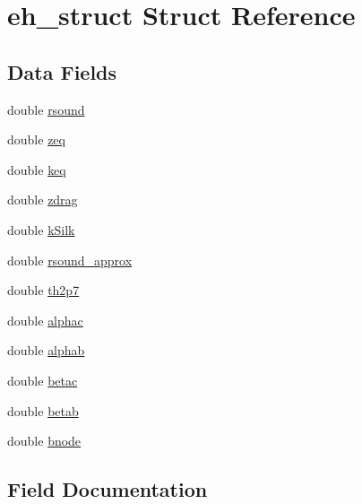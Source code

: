 \hypertarget{structeh__struct}{}\section{eh\+\_\+struct Struct Reference}
\label{structeh__struct}
\subsection*{Data Fields}
\begin{DoxyCompactItemize}
\item 
double \mbox{\hyperlink{structeh__struct_a3e1e2d1a06f3dfac72335503ccb2b219}{rsound}}
\item 
double \mbox{\hyperlink{structeh__struct_a115be04402be00203663cbf0cdeb6ccc}{zeq}}
\item 
double \mbox{\hyperlink{structeh__struct_a9eafa98df2832dd506fee87ec8a66b6c}{keq}}
\item 
double \mbox{\hyperlink{structeh__struct_af3d1d22e42cdf316b3572a9149d98596}{zdrag}}
\item 
double \mbox{\hyperlink{structeh__struct_a5765425c588003819015e840c4393da8}{k\+Silk}}
\item 
double \mbox{\hyperlink{structeh__struct_ab3e90131494df499d4be228108c04fb7}{rsound\+\_\+approx}}
\item 
double \mbox{\hyperlink{structeh__struct_afd9583995f4670685035d05749c385f0}{th2p7}}
\item 
double \mbox{\hyperlink{structeh__struct_a58de15592e924e87fe1b838599579a70}{alphac}}
\item 
double \mbox{\hyperlink{structeh__struct_a623316721501ca221093de25e216ac9f}{alphab}}
\item 
double \mbox{\hyperlink{structeh__struct_a9858b8089eb528b279fd4ce1dd1796b7}{betac}}
\item 
double \mbox{\hyperlink{structeh__struct_a9239bc067352dd1320a9b56ca6af8cae}{betab}}
\item 
double \mbox{\hyperlink{structeh__struct_a1448d0f2f95eb0d06b24b7f580c59142}{bnode}}
\end{DoxyCompactItemize}


\subsection{Field Documentation}
\mbox{\label{structeh__struct_a623316721501ca221093de25e216ac9f}} 
